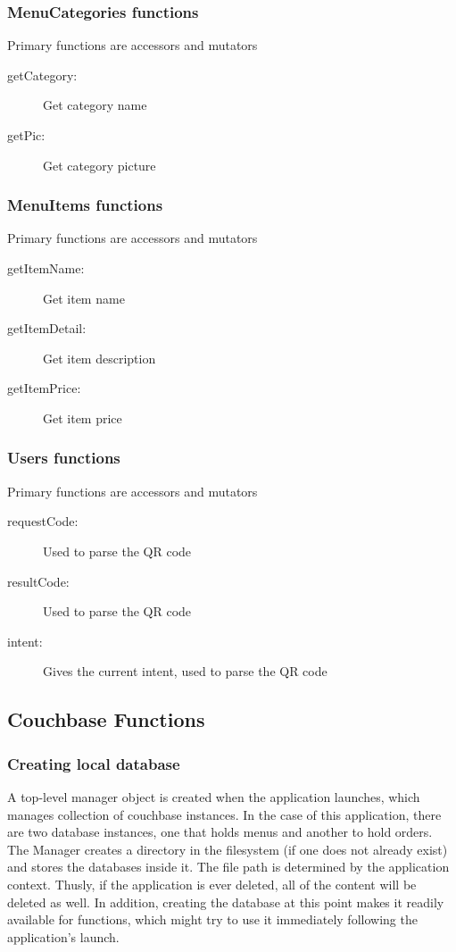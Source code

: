 \documentclass[12pt, titlepage]{article}
\begin{document}
\subsubsection{MenuCategories functions}
Primary functions are accessors and mutators
\begin{description}
  \item[getCategory:] Get category name
  \item[getPic:] Get category picture
\end{description}

\subsubsection{MenuItems functions}
Primary functions are accessors and mutators
\begin{description}
  \item[getItemName:] Get item name
  \item[getItemDetail:] Get item description
  \item[getItemPrice:] Get item price 
\end{description}

\subsubsection{Users functions}
Primary functions are accessors and mutators
\begin{description}
  \item[requestCode:] Used to parse the QR code 
  \item[resultCode:] Used to parse the QR code 
  \item[intent:] Gives the current intent, used to parse the QR code
\end{description}

\subsection{Couchbase Functions}

\subsubsection{Creating local database}
A top-level manager object is created when the application launches, which manages collection of couchbase instances. In the case of this application, there are two database instances, one that holds menus and another to hold orders. The Manager creates a directory in the filesystem (if one does not already exist) and stores the databases inside it. The file path is determined by the application context. Thusly, if the application is ever deleted, all of the content will be deleted as well. In addition, creating the database at this point makes it readily available for functions, which might try to use it immediately following the application’s launch. 
\end{document}
